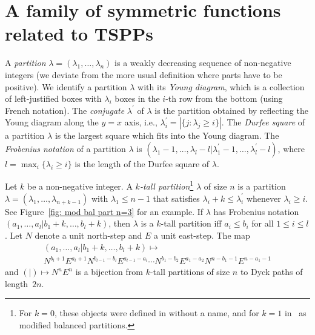 \documentclass[11pt]{article}
\theoremstyle{definition}
\numberwithin{equation}{section}
\newcommand{\la}{\lambda}
\newcounter{x}
\newcounter{y}
\newcounter{z}
\begin{document}
\section{A family of symmetric functions related to TSPPs}
\label{sec: TSPPs}

A \emph{partition} $\la=(\la_1,\ldots,\la_n)$ is a weakly decreasing sequence of non-negative integers (we deviate from the more usual definition where parts have to be positive). We identify a partition $\la$ with its \emph{Young diagram}, which is a collection of left-justified boxes with $\la_i$ boxes in the $i$-th row from the bottom (using French notation). The \emph{conjugate} $\la^\prime$ of $\la$ is the partition obtained by reflecting the Young diagram along the $y=x$ axis, i.e., $\la^\prime_i=|\{j: \la_j \geq i\}|$. The \emph{Durfee square} of a partition $\la$ is the largest square which fits into the Young diagram. The \emph{Frobenius notation} of a partition $\la$ is $(\la_1-1,\ldots,\la_l-l|\la_1^\prime-1,\ldots,\la_l^\prime-l)$, where $l= \max_i\{ \la_i \geq i \}$ is the length of the Durfee square of $\la$.
 
Let $k$ be a non-negative integer. A \emph{$k$-tall partition}\footnote{For $k=0$, these objects were defined in \cite[Ex 6.16(bb), p.223]{Stanley99} without a name, and for $k=1$ in~\cite{AignerFischerKonvalinkaNadeauTewari20} as modified balanced partitions.} $\la$ of size $n$ is a partition $\la=(\la_1,\ldots,\la_{n+k-1})$ with $\la_1\leq n-1$ that satisfies $\la_i +k \leq \la_i^\prime$ whenever $\la_i \geq i$. See Figure~\ref{fig: mod bal part n=3} for an example.
 If $\la$ has Frobenius notation $(a_1,\ldots,a_l|b_1+k,\ldots,b_l+k)$, then $\la$ is a $k$-tall partition iff $a_i \leq b_i$ for all $1 \leq i \leq l$. Let $N$ denote a unit north-step and $E$ a unit east-step. The map
\begin{multline*}
(a_1,\ldots,a_l|b_1+k,\ldots,b_l+k) \mapsto \\
N^{b_l+1}E^{a_l+1}N^{b_{l-1}-b_l}E^{a_{l-1}-a_l} \cdots N^{b_1-b_2}E^{a_1-a_2}N^{n-b_1-1}E^{n-a_1-1}
\end{multline*}
and $(|) \mapsto N^nE^n$ is a bijection from $k$-tall partitions of size $n$ to Dyck paths of length~$2n$.
\end{document}
